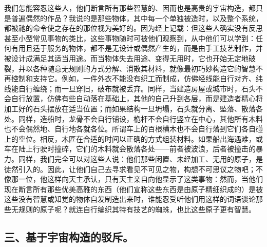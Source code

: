 我们怎能容忍这些人，他们断言所有那些智慧的、因而也是高贵的宇宙构造，都只是普遍偶然的作品？我说的是那些物体，其中每一个单独被造时，以及整个系统，都被祂的命令使之存在的那位视为美好的。因为经上记载：但这些人确实没有反思甚至小型常见事物的类比，这些事物随时可被他们观察到，从中他们可以学到：任何有用且适于服务的物体，都不是无设计或偶然产生的，而是由手工技艺制作，并被设计成满足其适当用途。而当物体失去用途、变得无用时，它也开始无定地破裂，并以各种随意无规则的方式分解、消散其材料，就像最初巧妙构造它的智慧不再控制和支持它。例如，一件外衣不能没有织工而制成，仿佛经线能自行对齐、纬线能自行缠绕；而一旦穿旧，破布就被丢弃。同样，当建造房屋或城市时，石头不会自行放置，仿佛有些自动落在基础上，其他的自己升到各层，而是建造者精心将加工好的石头摆放在适当位置；而如果结构一旦坍塌，石头就分离、坠落、散落各处。同样，造船时，龙骨不会自行铺设，桅杆不会自行竖立在中心，其他所有木料也不会偶然地、自行地各就各位。所谓车上的百根横木也不会自行落到它们各自碰上的空位。相反，木匠在合适的时间以正确的方式组装材料。如果船出海遇难，或车在陆上行驶时撞碎，它们的木料就会散落各处——前者被波浪，后者被撞击的暴力。同样，我们完全可以对这些人说：他们那些闲置、未经加工、无用的原子，是徒然引入的。因此，让他们自己去寻求看见不可见之物，构想不可思议之物吧；不像那一位，他这样向天主承认，只有天主亲自向他显示了这类事物：然而，当他们现在断言所有那些优美高雅的东西（他们宣称这些东西是由原子精细织成的）是被这些没有智慧或知觉的物体自发制造出来时，谁能忍受听他们用这样的词语谈论那些无规则的原子呢？就连自行编织其特有技艺的蜘蛛，也比这些原子更有智慧。\newline{}\par


\subsection{三、基于宇宙构造的驳斥。\newline{}}

